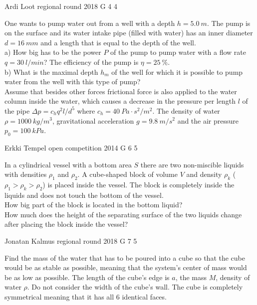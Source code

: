 \documentclass[11pt]{article}
\begin{document}
{Ardi Loot} %
{regional round} %
{2018} %
{G 4} %
{4} %
{

\ifEngStatement
One wants to pump water out from a well with a depth $h=\SI{5.0}{m}$. The pump is on the surface and its water intake pipe (filled with water) has an inner diameter $d=\SI{16}{mm}$ and a length that is equal to the depth of the well.\\
a) How big has to be the power $P$ of the pump to pump water with a flow rate $q=\SI{30}{l/min}$? The efficiency of the pump is $\eta=\SI{25}{\percent}$.\\
b) What is the maximal depth $h_{m}$ of the well for which it is possible to pump water from the well with this type of pump?\\
Assume that besides other forces frictional force is also applied to the water column inside the water, which causes a decrease in the pressure per length $l$ of the pipe $\Delta p=c_{h}q^{2}l/d^{5}$ where $c_{h}=\SI{40}{Pa\cdot s^{2}/m^{2}}$. The density of water $\rho=\SI{1000}{kg/m^{3}}$, gravitational acceleration $g=\SI{9.8}{m/s^{2}}$ and the air pressure $p_{0}=\SI{100}{kPa}$.
\fi
}

{Erkki Tempel} %
{open competition} %
{2014} %
{G 6} %
{5} %
{

\ifEngStatement
In a cylindrical vessel with a bottom area $S$ there are two non-miscible liquids with densities $\rho_1$ and $\rho_2$. A cube-shaped block of volume $V$ and density $\rho_k$ ($\rho_1>\rho_k>\rho_2$) is placed inside the vessel. The block is completely inside the liquids and does not touch the bottom of the vessel.\\
\osa How big part of the block is located in the bottom liquid?\\
\osa How much does the height of the separating surface of the two liquids change after placing the block inside the vessel?
\fi
}

{Jonatan Kalmus} %
{regional round} %
{2018} %
{G 7} %
{5} %
{

\ifEngStatement
Find the mass of the water that has to be poured into a cube so that the cube would be as stable as possible, meaning that the system’s center of mass would be as low as possible. The length of the cube’s edge is $a$, the mass $M$, density of water $\rho$. Do not consider the width of the cube’s wall. The cube is completely symmetrical meaning that it has all 6 identical faces.
\fi
}
\end{document}
